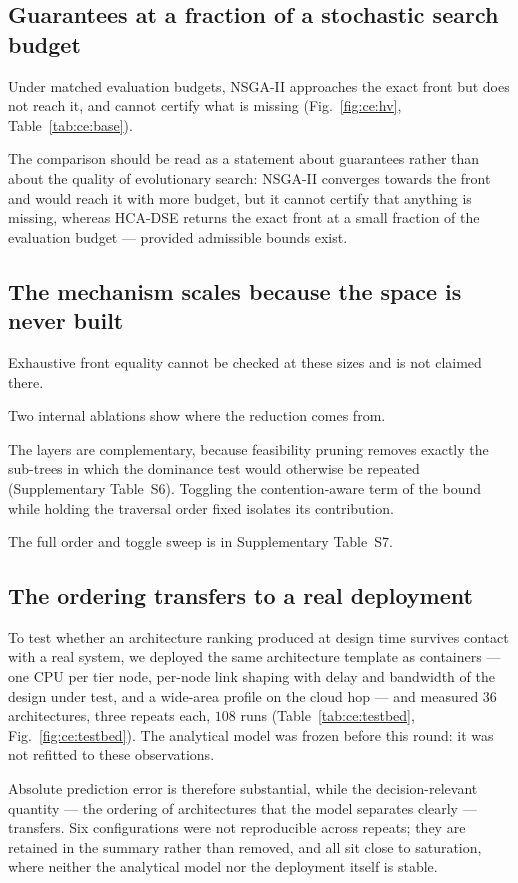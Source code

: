 \subsection{Guarantees at a fraction of a stochastic search budget}
Under matched evaluation budgets, NSGA-II approaches the exact front but does not reach
it, and cannot certify what is missing (Fig.~\ref{fig:ce:hv}, Table~\ref{tab:ce:base}).

The comparison should be read as a statement about guarantees rather than about the
quality of evolutionary search: NSGA-II converges towards the front and would reach it
with more budget, but it cannot certify that anything is missing, whereas HCA-DSE returns
the exact front at a small fraction of the evaluation budget --- provided admissible
bounds exist.

\subsection{The mechanism scales because the space is never built}

Exhaustive front equality cannot be checked at these sizes and is not claimed there.

Two internal ablations show where the reduction comes from.

The layers are complementary, because feasibility pruning removes exactly the sub-trees in
which the dominance test would otherwise be repeated (Supplementary Table~S6). Toggling
the contention-aware term of the bound while holding the traversal order fixed isolates
its contribution.

The full order and toggle sweep is in Supplementary Table~S7.

\subsection{The ordering transfers to a real deployment}
To test whether an architecture ranking produced at design time survives contact with a
real system, we deployed the same architecture template as containers --- one CPU per
tier node, per-node link shaping with delay and bandwidth of the design under test, and a
wide-area profile on the cloud hop --- and measured $36$ architectures, three repeats
each, $108$ runs (Table~\ref{tab:ce:testbed}, Fig.~\ref{fig:ce:testbed}). The analytical
model was frozen before this round: it was not refitted to these observations.

Absolute prediction error is therefore substantial, while the decision-relevant quantity
--- the ordering of architectures that the model separates clearly --- transfers. Six
configurations were not reproducible across repeats; they are retained in the summary
rather than removed, and all sit close to saturation, where neither the analytical model
nor the deployment itself is stable.
